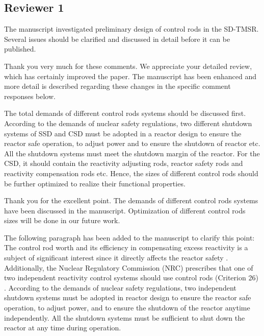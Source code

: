 \documentclass[answers,11pt]{exam}
\begin{document}
\begin{questions}
        \section*{Reviewer 1}

        \question The manuscript investigated preliminary design of control rods in the SD-TMSR. Several issues should be clarified and discussed in detail before it can be published.

        \begin{solution}
                Thank you very much for these comments. We appreciate your detailed review, which has certainly improved the paper. The manuscript has been enhanced and more detail is described regarding these changes in the specific comment responses below.
        \end{solution}


        \question  The total demands of different control rods systems should be discussed first. According to the demands of nuclear safety regulations, two different shutdown systems of SSD and CSD must be adopted in a reactor design to ensure the reactor safe operation, to adjust power and to ensure the shutdown of reactor etc. All the shutdown systems must meet the shutdown margin of the reactor. For the CSD, it should contain the reactivity adjusting rods, reactor safety rods and reactivity compensation rods etc. Hence, the sizes of different control rods should be further optimized to realize their functional properties.
        \begin{solution}
        		 
        		Thank you for the excellent point. The demands of different control rods systems have been discussed in the manuscript. Optimization of different control rods sizes will be done in our future work.
        		        		
        		The following paragraph has been added to the manuscript to clarify this point:\\
        		
The control rod worth and its efficiency in compensating excess reactivity is a subject of significant interest since it directly affects the reactor safety \cite{atkinson2019small}. Additionally, the Nuclear Regulatory Commission (NRC) prescribes that one of two independent reactivity control systems should use control rods (Criterion 26) \cite{nuclear1987standard}. According to the demands of nuclear safety regulations, two independent shutdown systems must be adopted in reactor design to ensure the reactor safe operation, to adjust power, and to ensure the shutdown of the reactor anytime independently. All the shutdown systems must be sufficient to shut down the reactor at any time during operation.
        		    

\end{solution}
\end{questions}
\end{document}
